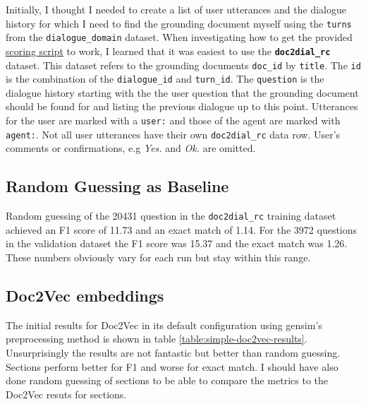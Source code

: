 \documentclass[11pt]{article}
\begin{document}
    Initially, I thought I needed to create a list of user utterances and the dialogue history for which I need to find the
    grounding document myself using the \texttt{turns} from the \texttt{dialogue\_domain} dataset. When investigating how
    to get the provided \href{https://github.com/doc2dial/sharedtask-dialdoc2021/blob/master/scripts/sharedtask_utils.py}{scoring script}
    to work, I learned that it was easiest to use the \textbf{\texttt{doc2dial\_rc}} dataset.
    This dataset refers to the grounding documents \texttt{doc\_id} by \texttt{title}.
    The \texttt{id} is the combination of the \texttt{dialogue\_id} and \texttt{turn\_id}. The \texttt{question} is the dialogue history starting
    with the the user question that the grounding document should be found for and listing the previous dialogue up to this point.
    Utterances for the user are marked with a \texttt{user:} and those of the agent are marked with \texttt{agent:}. Not
    all user utterances have their own \texttt{doc2dial\_rc} data row. User's comments or confirmations, e.g \textit{Yes.} and
    \textit{Ok.} are omitted.

    \subsection{Random Guessing as Baseline}\label{subsec:random-guessing-results}

    Random guessing of the 20431 question in the \texttt{doc2dial\_rc} training dataset achieved an F1 score of 11.73
    and an exact match of 1.14. For the 3972 questions in the validation dataset the F1 score was 15.37 and the exact match
    was 1.26. These numbers obviously vary for each run but stay within this range.

    \subsection{Doc2Vec embeddings}\label{subsec:doc2vec-results}

    The initial results for Doc2Vec in its default configuration using gensim's preprocessing method is shown
    in table \ref{table:simple-doc2vec-results}. Unsurprisingly the results are not fantastic but better than random
    guessing. Sections perform better for F1 and worse for exact match. I should have also done random guessing of sections
    to be able to compare the metrics to the Doc2Vec resuts for sections.
\end{document}
